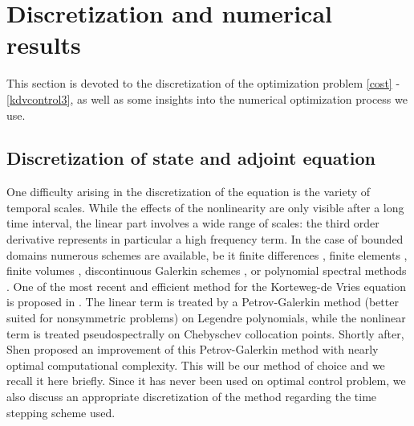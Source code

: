 \section{Discretization and numerical results}
\label{secnum}
This section is devoted to the discretization of the optimization problem \eqref{cost} - \eqref{kdvcontrol3}, as well as some insights into the numerical optimization process we use.
\subsection{Discretization of state and adjoint equation}
One difficulty arising in the discretization of the \KdVB equation is the variety of temporal scales. While the effects of the nonlinearity are only visible after a long time interval, the linear part involves a wide range of scales: the third order derivative represents in particular a high frequency term. In the case of bounded domains numerous schemes are available, be it finite differences \cite{djidjeli1995numerical,zabusky1965interaction}, finite elements \cite{winther1980conservative,arnold1982superconvergent}, finite volumes \cite{dutykh2013finite}, discontinuous Galerkin schemes \cite{Bona1986859,yan2002local}, or polynomial spectral methods \cite{ma2000legendre,ma2001optimal,shen2003new}. One of the most recent and efficient method for the Korteweg-de Vries equation is proposed in \cite{ma2000legendre}. The linear term is treated by a Petrov-Galerkin method (better suited for nonsymmetric problems) on Legendre polynomials, while the nonlinear term is treated pseudospectrally on Chebyschev collocation points. Shortly after, Shen \cite{shen2003new} proposed an improvement of this Petrov-Galerkin method with nearly optimal computational complexity. This will be our method of choice and we recall it here briefly. Since it has never been used on optimal control problem, we also discuss an appropriate discretization of the method regarding the time stepping scheme used.




